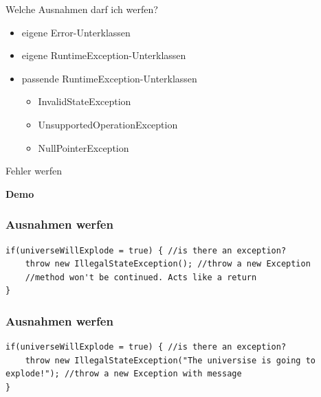 \documentclass[18pt]{beamer}
\begin{document}
\begin{frame}{Welche Ausnahmen darf ich werfen?}
	\begin{itemize}
		\item eigene Error-Unterklassen
		\item eigene RuntimeException-Unterklassen\pause
		\item passende RuntimeException-Unterklassen\pause
		\begin{itemize}
			\item InvalidStateException
			\item UnsupportedOperationException
			\item NullPointerException
		\end{itemize}
	\end{itemize}
\end{frame}


\begin{frame}{Fehler werfen}
	\begin{center}
		\textbf{Demo}
	\end{center}
\end{frame}


\begin{frame}[containsverbatim]
	\frametitle{Ausnahmen werfen}

\begin{lstlisting}
if(universeWillExplode = true) { //is there an exception?
	throw new IllegalStateException(); //throw a new Exception
	//method won't be continued. Acts like a return
}
	\end{lstlisting}
\end{frame}


\begin{frame}[containsverbatim]
	\frametitle{Ausnahmen werfen}

\begin{lstlisting}
if(universeWillExplode = true) { //is there an exception?
	throw new IllegalStateException("The universise is going to explode!"); //throw a new Exception with message
}
	\end{lstlisting}
\end{frame}

\end{document}
